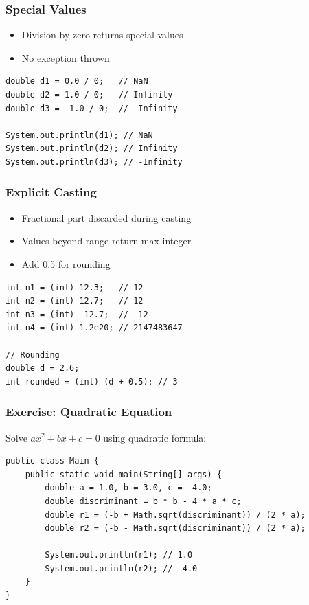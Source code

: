 \documentclass[serif, aspectratio=169]{beamer}
\begin{document}
\begin{frame}[fragile]
\frametitle{Special Values}
\begin{itemize}
    \item Division by zero returns special values
    \item No exception thrown
\end{itemize}
\begin{lstlisting}
double d1 = 0.0 / 0;   // NaN
double d2 = 1.0 / 0;   // Infinity
double d3 = -1.0 / 0;  // -Infinity

System.out.println(d1); // NaN
System.out.println(d2); // Infinity
System.out.println(d3); // -Infinity
\end{lstlisting}
\end{frame}

\begin{frame}[fragile]
\frametitle{Explicit Casting}
\begin{itemize}
    \item Fractional part discarded during casting
    \item Values beyond range return max integer
    \item Add 0.5 for rounding
\end{itemize}
\begin{lstlisting}
int n1 = (int) 12.3;   // 12
int n2 = (int) 12.7;   // 12
int n3 = (int) -12.7;  // -12
int n4 = (int) 1.2e20; // 2147483647

// Rounding
double d = 2.6;
int rounded = (int) (d + 0.5); // 3
\end{lstlisting}
\end{frame}

\begin{frame}[fragile]
\frametitle{Exercise: Quadratic Equation}
Solve $ax^2 + bx + c = 0$ using quadratic formula:
\begin{lstlisting}
public class Main {
    public static void main(String[] args) {
        double a = 1.0, b = 3.0, c = -4.0;
        double discriminant = b * b - 4 * a * c;
        double r1 = (-b + Math.sqrt(discriminant)) / (2 * a);
        double r2 = (-b - Math.sqrt(discriminant)) / (2 * a);
        
        System.out.println(r1); // 1.0
        System.out.println(r2); // -4.0
    }
}
\end{lstlisting}
\end{frame}
\end{document}
